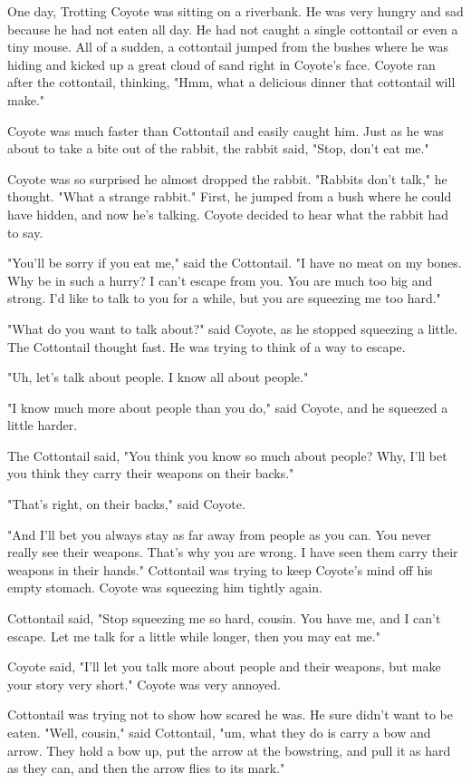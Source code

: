 One day, Trotting Coyote was sitting on a riverbank. He was very hungry and sad because he had not eaten all day. He had not caught a single cottontail or even a tiny mouse. All of a sudden, a cottontail jumped from the bushes where he was hiding and kicked up a great cloud of sand right in Coyote's face. Coyote ran after the cottontail, thinking, "Hmm, what a delicious dinner that cottontail will make."

Coyote was much faster than Cottontail and easily caught him. Just as he was about to take a bite out of the rabbit, the rabbit said, "Stop, don't eat me."

Coyote was so surprised he almost dropped the rabbit. "Rabbits don't talk," he thought. "What a strange rabbit." First, he jumped from a bush where he could have hidden, and now he's talking. Coyote decided to hear what the rabbit had to say.

"You'll be sorry if you eat me," said the Cottontail. "I have no meat on my bones. Why be in such a hurry? I can't escape from you. You are much too big and strong. I'd like to talk to you for a while, but you are squeezing me too hard."

"What do you want to talk about?" said Coyote, as he stopped squeezing a little. The Cottontail thought fast. He was trying to think of a way to escape.

"Uh, let's talk about people. I know all about people."

"I know much more about people than you do," said Coyote, and he squeezed a little harder.

The Cottontail said, "You think you know so much about people? Why, I'll bet you think they carry their weapons on their backs."

"That's right, on their backs," said Coyote.

"And I'll bet you always stay as far away from people as you can. You never really see their weapons. That's why you are wrong. I have seen them carry their weapons in their hands." Cottontail was trying to keep Coyote's mind off his empty stomach. Coyote was squeezing him tightly again.

Cottontail said, "Stop squeezing me so hard, cousin. You have me, and I can't escape. Let me talk for a little while longer, then you may eat me."

Coyote said, "I'll let you talk more about people and their weapons, but make your story very short." Coyote was very annoyed.

Cottontail was trying not to show how scared he was. He sure didn't want to be eaten. "Well, cousin," said Cottontail, "um, what they do is carry a bow and arrow. They hold a bow up, put the arrow at the bowstring, and pull it as hard as they can, and then the arrow flies to its mark."

